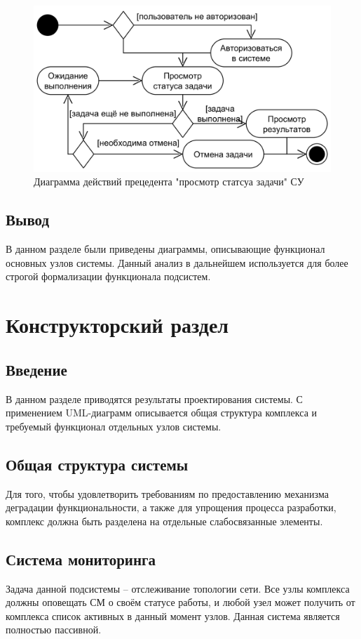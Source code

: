 \documentclass[a4paper,12pt]{report}
\numberwithin{equation}{section}
\begin{document}
\begin{figure}
  \centering
  \includegraphics[width=\linewidth]{diagrams/logic/activity-view}
  \caption{Диаграмма действий прецедента "просмотр статсуа задачи" СУ}
  \label{fig:logic-view}
\end{figure}

\subsection{Вывод}
В данном разделе были приведены диаграммы, описывающие функционал основных узлов системы.
Данный анализ в дальнейшем используется для более строгой формализации функционала подсистем.

\clearpage
\section{Конструкторский раздел}
\subsection{Введение}
В данном разделе приводятся результаты проектирования системы.
С применением UML-диаграмм описывается общая структура комплекса и требуемый функционал отдельных узлов системы.

\subsection{Общая структура системы}
Для того, чтобы удовлетворить требованиям по предоставлению механизма деградации функциональности,
а также для упрощения процесса разработки, комплекс должна быть разделена на отдельные слабосвязанные элементы.

\subsection{Система мониторинга}
Задача данной подсистемы -- отслеживание топологии сети.
Все узлы комплекса должны оповещать СМ о своём статусе работы, 
и любой узел может получить от комплекса список активных в данный момент узлов.
Данная система является полностью пассивной.
\end{document}
